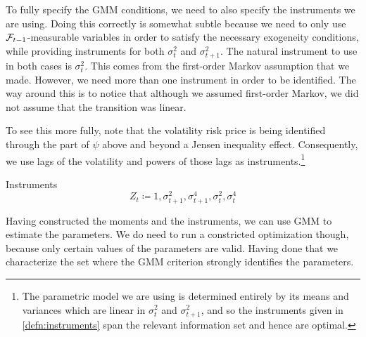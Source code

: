 \documentclass[11pt, letterpaper, twoside, final]{article}
\begin{document}
To fully specify the GMM conditions, we need to also specify the instruments we are using.
Doing this correctly is somewhat subtle because we need to only use $\mathcal{F}_{t-1}$-measurable variables in order to
satisfy the necessary exogeneity conditions, while providing instruments for both $\sigma^2_t$ and
$\sigma^2_{t+1}$. 
The natural instrument to use in both cases is $\sigma^2_t$.
This comes from the first-order Markov assumption that we made.
However, we need more than one instrument in order to be identified.
The way around this is to notice that although we assumed first-order Markov, we did not assume that the
transition was linear. 

To see this more fully, note that the volatility risk price is being identified through the part of $\psi$
above and beyond a Jensen inequality effect.
Consequently, we use lags of the volatility and powers of those lags as instruments.\footnote{The parametric model
we are using is determined entirely by its means and variances which are linear in $\sigma^2_t$ and
$\sigma^2_{t+1}$, and so the instruments given in \cref{defn:instruments} span the relevant information set and
hence are optimal.} 

\begin{defn}{Instruments}
    \label{defn:instruments}
    \begin{equation}
        Z_t \coloneqq 1, \sigma^2_{t+1}, \sigma^4_{t+1}, \sigma^2_{t}, \sigma^4_{t}
    \end{equation}
\end{defn}

Having constructed the moments and the instruments, we can use GMM to estimate the parameters.
We do need to run a constricted optimization though, because only certain values of the parameters are valid. 
Having done that we characterize the set where the GMM criterion strongly identifies the parameters.
\end{document}
